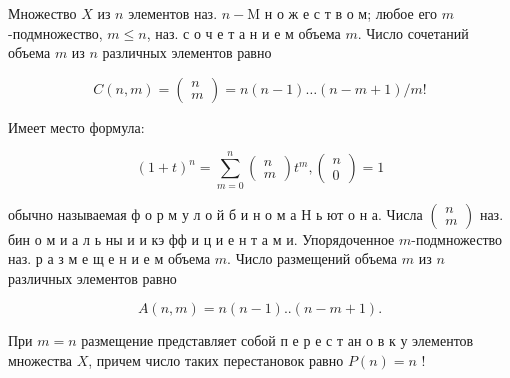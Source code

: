 \documentclass[10pt]{article}
\begin{document}
Множество $X$ из $n$ элементов наз. $n-\mathrm{M}$ н о ж е с т в о м; любое его $m$-подмножество, $m \leqslant n$, наз. с о ч е т а н и е м объема $m$. Число сочетаний объема $m$ из $n$ различных элементов равно



\[

C(n, m)=\left(\begin{array}{c}

n \\

m

\end{array}\right)=n(n-1) \ldots(n-m+1) / m !

\]



Имеет место формула:



\[

(1+t)^{n}=\sum_{m=0}^{n}\left(\begin{array}{l}

n \\

m

\end{array}\right) t^{m},\left(\begin{array}{l}

n \\

0

\end{array}\right)=1

\]



обычно называемая ф о р м у л о й б и н о м а Н ь ют о н а. Числа $\left(\begin{array}{l}n \\ m\end{array}\right)$ наз. бин о м и а л ь ны и и кэ фф и ц и е н т а м и. Упорядоченное $m$-подмножество наз. р а з м е щ е н и е м объема $m$. Число размещений объема $m$ из $n$ различных элементов равно



\[

A(n, m)=n(n-1) . .(n-m+1) .

\]



При $m=n$ размещение представляет собой п е р е с т ан о в к у элементов множества $X$, причем число таких перестановок равно $P(n)=n$ !
\end{document}
